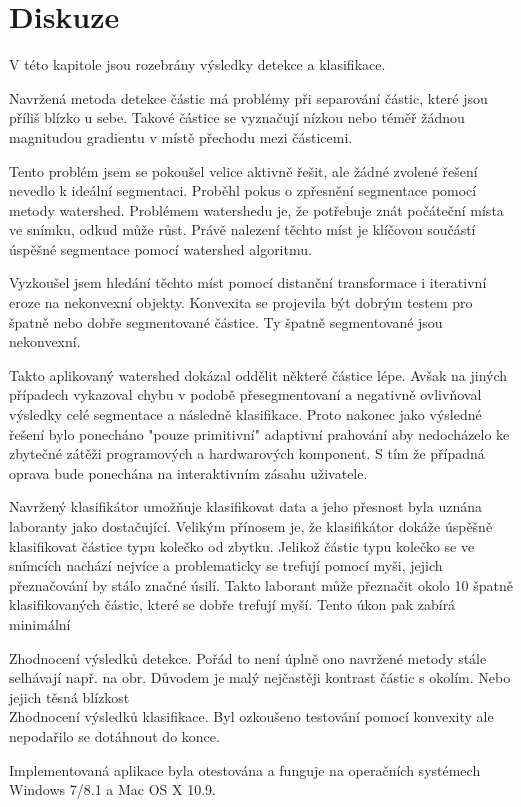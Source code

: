 \documentclass[11pt,twoside,a4paper,table]{book}
\begin{document}
\chapter{Diskuze}
V této kapitole jsou rozebrány výsledky detekce a klasifikace.

Navržená metoda detekce částic má problémy při separování částic, které jsou příliš blízko u sebe. Takové částice se vyznačují nízkou nebo téměř žádnou magnitudou gradientu v místě přechodu mezi částicemi.

Tento problém jsem se pokoušel velice aktivně řešit, ale žádné zvolené řešení nevedlo k ideální segmentaci. Proběhl pokus o zpřesnění segmentace pomocí metody watershed. Problémem watershedu je, že potřebuje znát počáteční místa ve snímku, odkud může růst. Právě nalezení těchto míst je klíčovou součástí úspěšné segmentace pomocí watershed algoritmu.

Vyzkoušel jsem hledání těchto míst pomocí distanční transformace i iterativní eroze na nekonvexní objekty. Konvexita se projevila být dobrým testem pro špatně nebo dobře segmentované částice. Ty špatně segmentované jsou nekonvexní.

Takto aplikovaný watershed dokázal oddělit některé částice lépe. Avšak na jiných případech vykazoval chybu v podobě přesegmentovaní a negativně ovlivňoval výsledky celé segmentace a následně klasifikace. Proto nakonec jako výsledné řešení bylo ponecháno "pouze primitivní" adaptivní prahování aby nedocházelo ke zbytečné zátěži programových a hardwarových komponent. S tím že případná oprava bude ponechána na interaktivním zásahu uživatele.

Navržený klasifikátor umožňuje klasifikovat data a jeho přesnost byla uznána laboranty jako dostačující. Velikým přínosem je, že klasifikátor dokáže úspěšně klasifikovat částice typu kolečko od zbytku. Jelikož částic typu kolečko se ve snímcích nachází nejvíce a problematicky se trefují pomocí myši, jejich přeznačování by stálo značné úsilí. Takto laborant může přeznačit okolo 10 špatně klasifikovaných částic, které se dobře trefují myší. Tento úkon pak zabírá minimální 

Zhodnocení výsledků detekce. Pořád to není úplně ono navržené metody stále selhávají např. na obr. Důvodem je malý nejčastěji kontrast částic s okolím. Nebo jejich těsná blízkost\\
Zhodnocení výsledků klasifikace. Byl ozkoušeno testování pomocí konvexity ale nepodařilo se dotáhnout do konce.

Implementovaná aplikace byla otestována a funguje na operačních systémech Windows 7/8.1 a Mac OS X 10.9.
\end{document}
